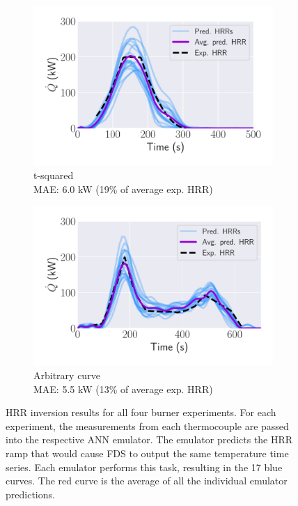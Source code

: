 \documentclass{article}
\begin{document}
\begin{figure}[htbp]
\begin{subfigure}[t]{.45\textwidth}
      \centering
      \includegraphics[width=\textwidth ,keepaspectratio]{figures/avg_inverse_t_squared.pdf}
      \caption{t-squared \\ MAE: 6.0 kW (19\% of average exp. HRR) }
      \label{fig:result_t_squared}
  \end{subfigure}
    \begin{subfigure}[t]{.45\textwidth}
      \centering
      \includegraphics[width=\textwidth ,keepaspectratio]{figures/avg_inverse_weird_curve.pdf}
      \caption{Arbitrary curve \\ MAE: 5.5 kW (13\% of average exp. HRR)}
      \label{fig:result_weird_curve}
  \end{subfigure}
  \caption{HRR inversion results for all four burner experiments. For each experiment, the measurements from each thermocouple are passed into the respective ANN emulator. The emulator predicts the HRR ramp that would cause FDS to output the same temperature time series. Each emulator performs this task, resulting in the 17 blue curves. The red curve is the average of all the individual emulator predictions.} 
  \label{fig:burner_results}
\end{figure}
 
\end{document}

